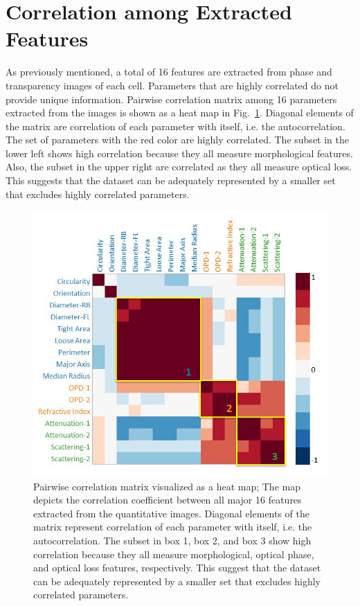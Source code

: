 \documentclass[aps,pra,reprint,superscriptaddress]{revtex4-1}
\begin{document}
\section{Correlation among Extracted Features}

As previously mentioned, a total of 16 features are extracted from phase and transparency images of each cell. Parameters that are highly correlated do not provide unique information. Pairwise correlation matrix among 16 parameters extracted from the images is shown as a heat map in Fig.~\ref{fig:Correlation}. Diagonal elements of the matrix are correlation of each parameter with itself, i.e. the autocorrelation. The set of parameters with the red color are highly correlated. The subset in the lower left shows high correlation because they all measure morphological features. Also, the subset in the upper right are correlated as they all measure optical loss. This suggests that the dataset can be adequately represented by a smaller set that excludes highly correlated parameters.

\begin{figure}
\includegraphics[scale=0.6]{FigureCorrelation.jpg}
\caption{\label{fig:Correlation} Pairwise correlation matrix visualized as a heat map; The map depicts the correlation coefficient between all major 16 features extracted from the quantitative images. Diagonal elements of the matrix represent correlation of each parameter with itself, i.e. the autocorrelation. The subset in box 1, box 2, and box 3 show high correlation because they all measure morphological, optical phase, and optical loss features, respectively. This suggest that the dataset can be adequately represented by a smaller set that excludes highly correlated parameters.}
\end{figure}
\end{document}
